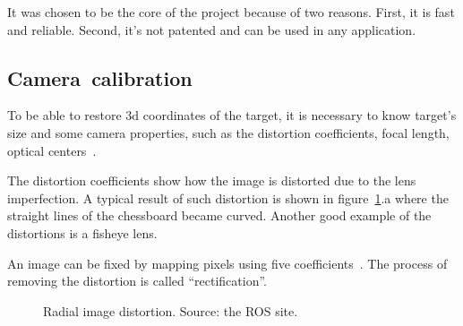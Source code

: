 \documentclass[12pt]{article}
\begin{document}
    It was chosen to be the core of the project because of two reasons.
    First, it is fast and reliable. Second, it's not patented and can be used
    in any application.

    \subsection{Camera~calibration}

    To be able to restore 3d coordinates of the target, it is necessary to
    know target's size and some camera properties, such as the distortion
    coefficients, focal length, optical centers~\cite{OpenCVCalib}.

    The distortion coefficients show how the image is distorted due to 
    the lens imperfection. A typical result of such distortion is shown
    in figure~\ref{fig:calib}.a where the straight lines of the chessboard
    became curved. Another good example of the distortions is a fisheye lens.

    An image can be fixed by mapping pixels
    using five coefficients~\cite{RectificationMatlab}.
    The process of removing the distortion is called ``rectification''.


    \begin{figure}[htbp]
        \noindent\centering
        \hspace{1mm}
        \caption{Radial image distortion. Source: the ROS site.}
        \label{fig:calib}
    \end{figure}
\end{document}
